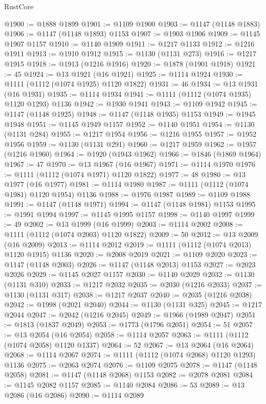 \begin{lexlean}{RustCore}
\begin{coremodule}
@1900 := @1888 @1899
@1901 := @1109 @1900
@1903 := @1147 (@1148 @1883)
@1906 := @1147 (@1148 @1893) @1153
@1907 := @1903 @1906
@1909 := @1145 @1907 @1157
@1910 := @1140 @1909
@1911 := @1217 @1133
@1912 := @1216 @1911
@1913 := @1910 @1912
@1915 := @1130 (@1131 @273)
@1916 := @1217 @1915
@1918 := @1913 (@1216 @1916)
@1920 := @1878 (@1901 @1918)
@1921 := 45
@1924 := @13 @1921 (@16 @1921)
@1925 := @1114 @1924
@1930 := @1111 (@1112 (@1074 @1925) @1120 @1822)
@1931 := 46
@1934 := @13 @1931 (@16 @1931)
@1935 := @1114 @1934
@1941 := @1111 (@1112 (@1074 @1935) @1120 @1293) @1136
@1942 := @1930 @1941
@1943 := @1109 @1942
@1945 := @1147 (@1148 @1925)
@1948 := @1147 (@1148 @1935) @1153
@1949 := @1945 @1948
@1951 := @1145 @1949 @1157
@1952 := @1140 @1951
@1954 := @1130 (@1131 @284)
@1955 := @1217 @1954
@1956 := @1216 @1955
@1957 := @1952 @1956
@1959 := @1130 (@1131 @291)
@1960 := @1217 @1959
@1962 := @1957 (@1216 @1960)
@1964 := @1920 (@1943 @1962)
@1966 := @1846 (@1869 @1964)
@1967 := 47
@1970 := @13 @1967 (@16 @1967)
@1971 := @1114 @1970
@1976 := @1111 (@1112 (@1074 @1971) @1120 @1822)
@1977 := 48
@1980 := @13 @1977 (@16 @1977)
@1981 := @1114 @1980
@1987 := @1111 (@1112 (@1074 @1981) @1120 @1954) @1136
@1988 := @1976 @1987
@1989 := @1109 @1988
@1991 := @1147 (@1148 @1971)
@1994 := @1147 (@1148 @1981) @1153
@1995 := @1991 @1994
@1997 := @1145 @1995 @1157
@1998 := @1140 @1997
@1999 := 49
@2002 := @13 @1999 (@16 @1999)
@2003 := @1114 @2002
@2008 := @1111 (@1112 (@1074 @2003) @1120 @1822)
@2009 := 50
@2012 := @13 @2009 (@16 @2009)
@2013 := @1114 @2012
@2019 := @1111 (@1112 (@1074 @2013) @1120 @1915) @1136
@2020 := @2008 @2019
@2021 := @1109 @2020
@2023 := @1147 (@1148 @2003)
@2026 := @1147 (@1148 @2013) @1153
@2027 := @2023 @2026
@2029 := @1145 @2027 @1157
@2030 := @1140 @2029
@2032 := @1130 (@1131 @310)
@2033 := @1217 @2032
@2035 := @2030 (@1216 @2033)
@2037 := @1130 (@1131 @317)
@2038 := @1217 @2037
@2040 := @2035 (@1216 @2038)
@2042 := @1998 (@2021 @2040)
@2044 := @1130 (@1131 @325)
@2045 := @1217 @2044
@2047 := @2042 (@1216 @2045)
@2049 := @1966 (@1989 @2047)
@2051 := @1813 (@1837 @2049)
@2053 := @1773 (@1796 @2051)
@2054 := 51
@2057 := @13 @2054 (@16 @2054)
@2058 := @1114 @2057
@2063 := @1111 (@1112 (@1074 @2058) @1120 @1337)
@2064 := 52
@2067 := @13 @2064 (@16 @2064)
@2068 := @1114 @2067
@2074 := @1111 (@1112 (@1074 @2068) @1120 @1293) @1136
@2075 := @2063 @2074
@2076 := @1109 @2075
@2078 := @1147 (@1148 @2058)
@2081 := @1147 (@1148 @2068) @1153
@2082 := @2078 @2081
@2084 := @1145 @2082 @1157
@2085 := @1140 @2084
@2086 := 53
@2089 := @13 @2086 (@16 @2086)
@2090 := @1114 @2089

\end{coremodule}
\end{lexlean}

